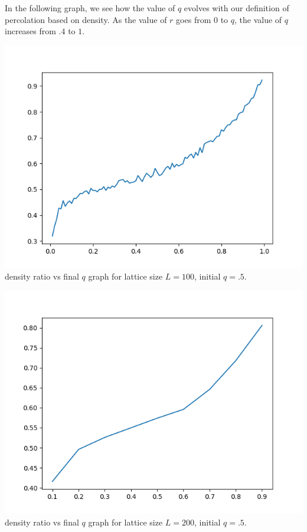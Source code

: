 \documentclass[article, 11pt, a4paper, onesize]{memoir}
\begin{document}
In the following graph, we see how the value of \(q\) evolves with our definition of
percolation based on density. As the value of \(r\) goes from \(0\) to \(q\), the value of
\(q\) increases from \(.4\) to \(1\).

\begin{minipage}{.5\linewidth}
    \begin{center}
        \includegraphics[width=.9\linewidth]{ratio_vs_qqq.png}
        density ratio vs final \(q\) graph for lattice size \(L=100\), initial \(q=.5\). 
    \end{center}
\end{minipage}\hfill%
\begin{minipage}{.5\linewidth}
    \begin{center}
        \includegraphics[width=.9\linewidth]{ratio_vs_qq.png}
        density ratio vs final \(q\) graph for lattice size \(L=200\), initial \(q=.5\). 
    \end{center}
\end{minipage}
\end{document}
